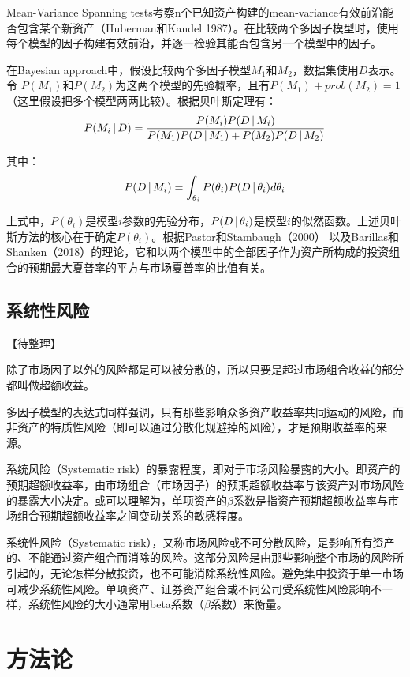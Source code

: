 \documentclass[11pt]{article}
\begin{document}
Mean-Variance Spanning tests考察n个已知资产构建的mean-variance有效前沿能否包含某个新资产（Huberman和Kandel 1987）。在比较两个多因子模型时，使用每个模型的因子构建有效前沿，并逐一检验其能否包含另一个模型中的因子。

在Bayesian approach中，假设比较两个多因子模型$M_1$和$M_2$，数据集使用$D$表示。令 $P(M_1)$和$P(M_2)$为这两个模型的先验概率，且有$P(M_1) + prob(M_2) = 1$（这里假设把多个模型两两比较）。根据贝叶斯定理有：
\begin{equation*}
    P(M_i \,\vert\, D) = \frac{P(M_i)P(D \,\vert\, M_i)}{P(M_1)P(D\,\vert\, M_1) + P(M_2)P(D\,\vert\, M_2)}
\end{equation*}

其中：
\begin{equation*}
    P(D \,\vert\, M_i) = \int_{\theta_i} P(\theta_i) P(D \,\vert\, \theta_i) d\theta_i
\end{equation*}

上式中，$P(\theta_i)$是模型$i$参数的先验分布，$P(D \,\vert\, \theta_i)$是模型$i$的似然函数。上述贝叶斯方法的核心在于确定$P(\theta_i)$。根据Pastor和Stambaugh（2000） 以及Barillas和Shanken（2018）的理论，它和以两个模型中的全部因子作为资产所构成的投资组合的预期最大夏普率的平方与市场夏普率的比值有关。

\subsection{系统性风险}

【待整理】

除了市场因子以外的风险都是可以被分散的，所以只要是超过市场组合收益的部分都叫做超额收益。

多因子模型的表达式同样强调，只有那些影响众多资产收益率共同运动的风险，而非资产的特质性风险（即可以通过分散化规避掉的风险），才是预期收益率的来源。

系统风险（Systematic risk）的暴露程度，即对于市场风险暴露的大小。即资产的预期超额收益率，由市场组合（市场因子）的预期超额收益率与该资产对市场风险的暴露大小决定。或可以理解为，单项资产的$\beta$系数是指资产预期超额收益率与市场组合预期超额收益率之间变动关系的敏感程度。

系统性风险（Systematic risk），又称市场风险或不可分散风险，是影响所有资产的、不能通过资产组合而消除的风险。这部分风险是由那些影响整个市场的风险所引起的，无论怎样分散投资，也不可能消除系统性风险。避免集中投资于单一市场可减少系统性风险。单项资产、证券资产组合或不同公司受系统性风险影响不一样，系统性风险的大小通常用beta系数（$\beta$系数）来衡量。

\section{方法论}
\end{document}
